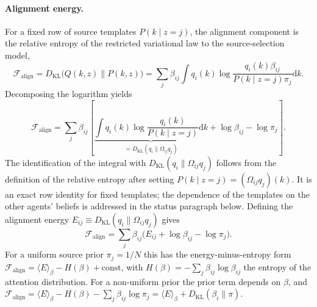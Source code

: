 \documentclass[11pt]{article}
\begin{document}
\paragraph{Alignment energy.}
For a fixed row of source templates $P(k\mid z{=}j)$, the alignment component is the relative entropy of the restricted variational law to the source-selection model,
\begin{equation}
\mathcal{F}_{\text{align}} = D_{\mathrm{KL}}\big(Q(k,z) \| P(k,z)\big) = \sum_j \beta_{ij} \int q_i(k) \log \frac{q_i(k) \beta_{ij}}{P(k \mid z{=}j) \pi_j} \mathrm{d}k.
\end{equation}
Decomposing the logarithm yields
\begin{equation}
\mathcal{F}_{\text{align}} = \sum_j \beta_{ij} \left[ \underbrace{\int q_i(k) \log \frac{q_i(k)}{P(k \mid z{=}j)} \mathrm{d}k}_{= D_{\mathrm{KL}}(q_i \| \Omega_{ij} q_j)} + \log \beta_{ij} - \log \pi_j \right].
\label{eq:mixture_free_energy}
\end{equation}
The identification of the integral with $D_{\mathrm{KL}}(q_i \| \Omega_{ij} q_j)$ follows from the definition of the relative entropy after setting $P(k \mid z{=}j) = (\Omega_{ij} q_j)(k)$. It is an exact row identity for fixed templates; the dependence of the templates on the other agents' beliefs is addressed in the status paragraph below. Defining the alignment energy $E_{ij} \equiv D_{\mathrm{KL}}(q_i \| \Omega_{ij} q_j)$ gives
\begin{equation}
\mathcal{F}_{\text{align}} = \sum_j \beta_{ij} \big( E_{ij} + \log \beta_{ij} - \log \pi_j \big).
\label{eq:mixture_energy_entropy}
\end{equation}
For a uniform source prior $\pi_j = 1/N$ this has the energy-minus-entropy form $\mathcal{F}_{\text{align}} = \langle E \rangle_\beta - H(\beta) + \text{const}$, with $H(\beta) = -\sum_j \beta_{ij} \log \beta_{ij}$ the entropy of the attention distribution. For a non-uniform prior the prior term depends on $\beta$, and $\mathcal{F}_{\text{align}} = \langle E \rangle_\beta - H(\beta) - \sum_j \beta_{ij} \log \pi_j = \langle E \rangle_\beta + D_{\mathrm{KL}}(\beta_i \| \pi)$.
\end{document}
